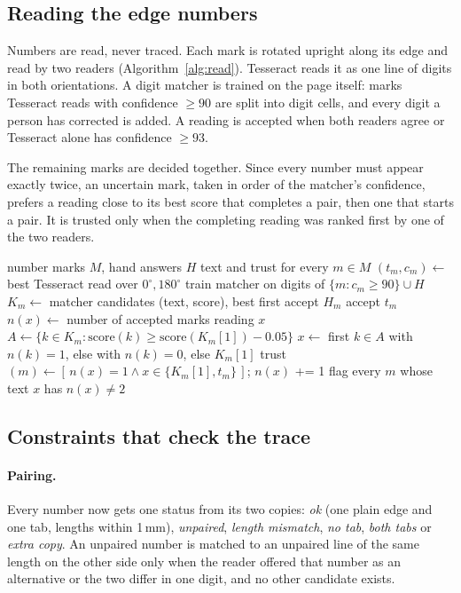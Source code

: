\subsection{Reading the edge numbers}

Numbers are read, never traced. Each mark is rotated upright along its edge and read by two
readers (Algorithm~\ref{alg:read}). Tesseract \cite{smith2007tesseract} reads it as one line of
digits in both orientations. A digit matcher is trained on the page itself: marks Tesseract
reads with confidence $\ge 90$ are split into digit cells, and every digit a person has corrected
is added. A reading is accepted when both readers agree or Tesseract alone has confidence $\ge 93$.

The remaining marks are decided together. Since every number must appear exactly twice, an
uncertain mark, taken in order of the matcher's confidence, prefers a reading close to its best
score that completes a pair, then one that starts a pair. It is trusted only when the completing
reading was ranked first by one of the two readers.

\begin{algorithm}[t]
\caption{Two readers and joint pair-up}
\label{alg:read}
\begin{algorithmic}[1]
\Require number marks $M$, hand answers $H$
\Ensure text and trust for every $m \in M$
 $(t_m, c_m) \gets$ best Tesseract read over $0^\circ, 180^\circ$ \EndFor
\State train matcher on digits of $\{m : c_m \ge 90\} \cup H$
  \State $K_m \gets$ matcher candidates (text, score), best first
   accept $H_m$
   accept $t_m$
  \EndIf
\EndFor
\State $n(x) \gets$ number of accepted marks reading $x$
  \State $A \gets \{k \in K_m : \mathrm{score}(k) \ge \mathrm{score}(K_m[1]) - 0.05\}$
  \State $x \gets$ first $k \in A$ with $n(k)=1$, else with $n(k)=0$, else $K_m[1]$
  \State trust$(m) \gets [\,n(x)=1 \wedge x \in \{K_m[1], t_m\}\,]$; $n(x)$ += 1
\EndFor
\State flag every $m$ whose text $x$ has $n(x) \ne 2$
\end{algorithmic}
\end{algorithm}

\subsection{Constraints that check the trace}
\label{sec:constraints}

\paragraph{Pairing.} Every number now gets one status from its two copies: \emph{ok} (one plain
edge and one tab, lengths within 1\,mm), \emph{unpaired}, \emph{length mismatch}, \emph{no tab},
\emph{both tabs} or \emph{extra copy}. An unpaired number is matched to an unpaired line of the
same length on the other side only when the reader offered that number as an alternative or the
two differ in one digit, and no other candidate exists.

